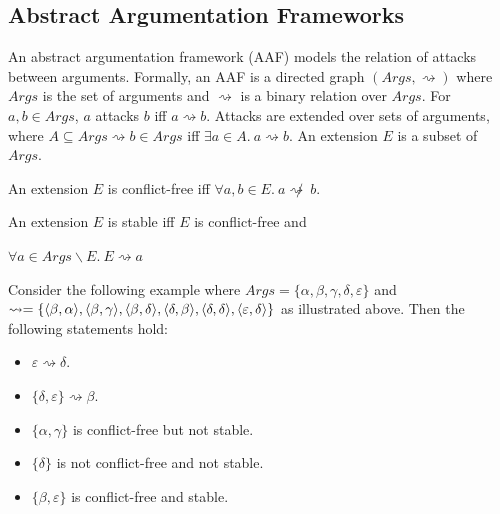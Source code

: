 \subsection{Abstract Argumentation Frameworks}

An abstract argumentation framework (AAF) models the relation of attacks between arguments.\cite{aa} Formally, an AAF is a directed graph $(Args,\rightsquigarrow)$ where $Args$ is the set of arguments and $\rightsquigarrow$ is a binary relation over $Args$. For $a,b\in Args$, $a$ attacks $b$ iff $a\rightsquigarrow b$. Attacks are extended over sets of arguments, where $A\subseteq Args\rightsquigarrow b\in Args$ iff $\exists a\in A.\ a\rightsquigarrow b$. An extension $E$ is a subset of $Args$.

\begin{definition}
	An extension $E$ is conflict-free iff $\forall a,b\in E.\ a\not\rightsquigarrow\ b$.
\end{definition}

\begin{definition}
	An extension $E$ is stable iff $E$ is conflict-free and
	
	$\forall a\in Args\backslash E.\ E\rightsquigarrow a$
\end{definition}

\begin{center}
\end{center}

Consider the following example where $Args=\{\alpha,\beta,\gamma,\delta,\varepsilon\}$ and $	\rightsquigarrow=\{
\langle{\beta},{\alpha}\rangle,\\
\langle{\beta},{\gamma}\rangle,
\langle{\beta},{\delta}\rangle,
\langle{\delta},{\beta}\rangle,
\langle{\delta},{\delta}\rangle,
\langle{\varepsilon},{\delta}\rangle
\}$ as illustrated above. Then the following statements hold:
\begin{itemize}
	\item $\varepsilon\rightsquigarrow\delta$.
	\item $\{\delta,\varepsilon\}\rightsquigarrow\beta$.
	\item $\{\alpha,\gamma\}$ is conflict-free but not stable.
	\item $\{\delta\}$ is not conflict-free and not stable.
	\item $\{\beta,\varepsilon\}$ is conflict-free and stable.
\end{itemize}


